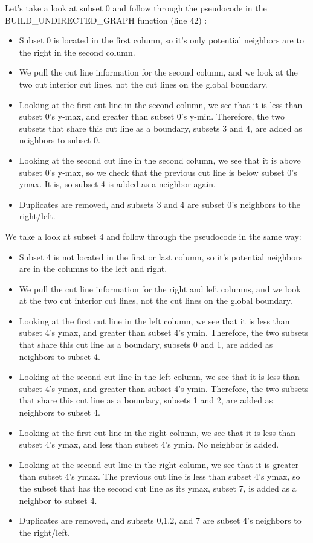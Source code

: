 \documentclass[11pt, letterpaper,titlepage,oneside]{article}
\begin{document}
Let's take a look at subset 0 and follow through the pseudocode in the BUILD\_UNDIRECTED\_GRAPH function (line 42) :

\begin{itemize}
\item Subset 0 is located in the first column, so it's only potential neighbors are to the right in the second column.
\item We pull the cut line information for the second column, and we look at the two cut interior cut lines, not the cut lines on the global boundary.
\item Looking at the first cut line in the second column, we see that it is less than subset 0's y-max, and greater than subset 0's y-min. Therefore, the two subsets that share this cut line as a boundary, subsets 3 and 4, are added as neighbors to subset 0. 
\item Looking at the second cut line in the second column, we see that it is above subset 0's y-max, so we check that the previous cut line is below subset 0's ymax. It is, so subset 4 is added as a neighbor again.
\item Duplicates are removed, and subsets 3 and 4 are subset 0's neighbors to the right/left.
\end{itemize}

We take a look at subset 4 and follow through the pseudocode in the same way:

\begin{itemize}
\item Subset 4 is not located in the first or last column, so it's potential neighbors are in the columns to the left and right.
\item  We pull the cut line information for the right and left columns, and we look at the two cut interior cut lines, not the cut lines on the global boundary.
\item Looking at the first cut line in the left column, we see that it is less than subset 4's ymax, and greater than subset 4's ymin. Therefore, the two subsets that share this cut line as a boundary, subsets 0 and 1, are added as neighbors to subset 4.
\item Looking at the second cut line in the left column,  we see that it is less than subset 4's ymax, and greater than subset 4's ymin. Therefore, the two subsets that share this cut line as a boundary, subsets 1 and 2, are added as neighbors to subset 4.
\item Looking at the first cut line in the right column, we see that it is less than subset 4's ymax, and less than subset 4's ymin. No neighbor is added.
\item Looking at the second cut line in the right column, we see that it is greater than subset 4's ymax. The previous cut line is less than subset 4's ymax, so the subset that has the second cut line as its ymax, subset 7, is added as a neighbor to subset 4.
\item Duplicates are removed, and subsets 0,1,2, and 7 are subset 4's neighbors to the right/left.
\end{itemize}
\end{document}
